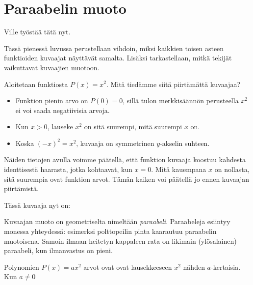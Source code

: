 \chapter{Paraabelin muoto}

Ville työstää tätä nyt.

Tässä pienessä luvussa perustellaan vihdoin, miksi kaikkien toisen asteen funktioiden
kuvaajat näyttävät samalta. Lisäksi tarkastellaan, mitkä tekijät vaikuttavat kuvaajien
muotoon.

Aloitetaan funktiosta $P(x)=x^2$. Mitä tiedämme siitä piirtämättä kuvaajaa?
\begin{itemize}
\item Funktion pienin arvo on $P(0) = 0$, sillä tulon merkkisäännön perusteella $x^2$ ei voi saada negatiivisia arvoja.
\item Kun $x > 0$, lauseke $x^2$  on sitä
suurempi, mitä suurempi $x$ on.
\item Koska $(-x)^2 = x^2$, kuvaaja on symmetrinen $y$-akselin suhteen. 
\end{itemize}  

Näiden tietojen avulla voimme päätellä, että funktion kuvaaja koostuu kahdesta
identtisestä haarasta, jotka kohtaavat, kun $x=0$. Mitä kauempana $x$ on nollasta,
sitä suurempia ovat funktion arvot. Tämän kaiken voi päätellä jo ennen kuvaajan
piirtämistä.

Tässä kuvaaja nyt on:
\begin{center}
\begin{kuvaajapohja}{2}{-2}{2}{-1}{4}
\end{kuvaajapohja}
\end{center}
Kuvaajan muoto on geometriselta nimeltään \emph{paraabeli}. Paraabeleja esiintyy monessa yhteydessä: esimerksi polttopeilin pinta kaarautuu paraabelin muotoisena. Samoin ilmaan heitetyn kappaleen
rata on likimain (ylösalainen) paraabeli, kun ilmanvastus on pieni.

Polynomien $P(x)=ax^2$ arvot ovat ovat lausekkeeseen $x^2$ nähden $a$-kertaisia. Kun
$a\neq 0$ 

